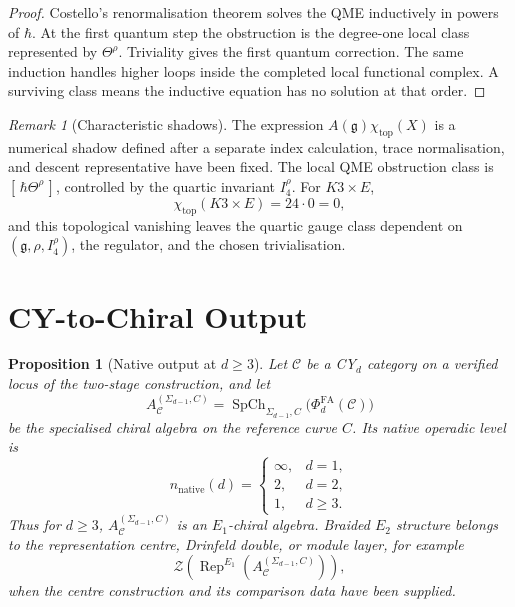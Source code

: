 \documentclass[11pt]{amsart}
\theoremstyle{plain}
\newtheorem{proposition}[theorem]{Proposition}
\theoremstyle{definition}
\theoremstyle{remark}
\newtheorem{remark}[theorem]{Remark}
\providecommand{\cC}{\mathcal{C}}
\providecommand{\cZ}{\mathcal{Z}}
\providecommand{\fg}{\mathfrak{g}}
\providecommand{\Rep}{\operatorname{Rep}}
\providecommand{\Eone}{E_1}
\providecommand{\Etwo}{E_2}
\providecommand{\PhiFA}{\Phi^{\mathrm{FA}}}
\providecommand{\SpCh}{\operatorname{SpCh}}
\begin{document}
\begin{proof}
Costello's renormalisation theorem solves the QME inductively in powers
of \(\hbar\). At the first quantum step the obstruction is the
degree-one local class represented by \(\Theta^\rho\). Triviality gives
the first quantum correction. The same induction handles higher loops
inside the completed local functional complex. A surviving class means
the inductive equation has no solution at that order.
\end{proof}

\begin{remark}[Characteristic shadows]
\label{rem:characteristic-shadows}
The expression \(A(\fg)\chi_{\mathrm{top}}(X)\) is a numerical shadow
defined after a separate index calculation, trace normalisation, and
descent representative have been fixed. The local QME obstruction
class is \([\,\hbar\Theta^\rho\,]\), controlled by the quartic invariant
\(I_4^\rho\). For \(K3\times E\),
\[
  \chi_{\mathrm{top}}(K3\times E)=24\cdot0=0,
\]
and this topological vanishing leaves the quartic gauge class dependent
on \((\fg,\rho,I_4^\rho)\), the regulator, and the chosen
trivialisation.
\end{remark}

\section{CY-to-Chiral Output}
\label{sec:cy-to-chiral-output}

\begin{proposition}[Native output at \(d\geq3\)]
\label{prop:native-output-dgeq3}
Let \(\cC\) be a CY$_d$ category on a verified locus of the two-stage
construction, and let
\[
  A_\cC^{(\Sigma_{d-1},C)}
  =
  \SpCh_{\Sigma_{d-1},C}\bigl(\PhiFA_d(\cC)\bigr)
\]
be the specialised chiral algebra on the reference curve \(C\). Its
native operadic level is
\[
  n_{\mathrm{native}}(d)
  =
  \begin{cases}
  \infty, & d=1,\\
  2, & d=2,\\
  1, & d\geq3.
  \end{cases}
\]
Thus for \(d\geq3\), \(A_\cC^{(\Sigma_{d-1},C)}\) is an \(\Eone\)-chiral
algebra. Braided \(\Etwo\) structure belongs to the representation
centre, Drinfeld double, or module layer, for example
\[
  \cZ\!\left(\Rep^{\Eone}(A_\cC^{(\Sigma_{d-1},C)})\right),
\]
when the centre construction and its comparison data have been supplied.
\end{proposition}
\end{document}
